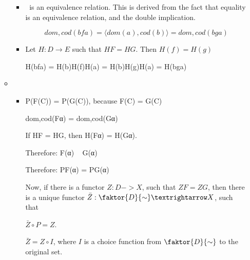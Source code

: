 \documentclass{article}
\begin{document}
\begin{enumerate}
\begin{itemize}
          \begin{itemize}
            \item $~$ is an equivalence relation. This is derived from the
              fact that equality is an equivalence relation, and the double
              implication.

               $$dom,cod(bfa) = \langle dom(a), cod(b) \rangle = dom,cod(bga)$$

            \item
              
              Let $H : D → E$ such that $HF = HG$. Then $H(f) = H(g)$

              H(bfa) = H(b)H(f)H(a) = H(b)H(g)H(a) = H(bga)
              
          \end{itemize}

        \item



          \begin{itemize}
            \item %

              P(F(C)) = P(G(C)), because F(C) = G(C)


                dom,cod(Fα) = dom,cod(Gα)

                If HF = HG, then H(Fα) = H(Gα).

              Therefore: F(α) ~ G(α)

              Therefore: PF(α) = PG(α)

              Now, if there is a functor $Z : D -> X$, such that
              $ZF = ZG$, then there is a unique functor $\bar{Z} : \faktor{D}{\sim} → X$, such that

              $\bar{Z} \circ P = Z$. 

              $\bar{Z} = Z \circ I$, where $I$ is a choice function
              from $\faktor{D}{\sim}$ to the original set.


\end{itemize}
\end{itemize}
\end{enumerate}
\end{document}
